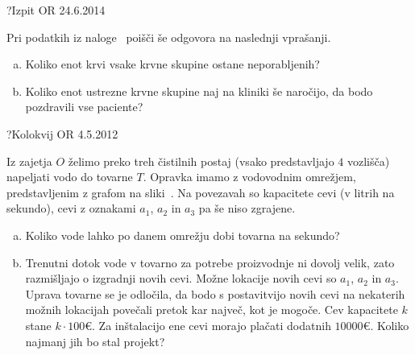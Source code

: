 \begin{naloga}{?}{Izpit OR 24.6.2014}
\begin{vprasanje}[kri2]
Pri podatkih iz naloge~ poišči še odgovora na naslednji vprašanji.
\begin{enumerate}[(a)]
\item Koliko enot krvi vsake krvne skupine ostane neporabljenih?
\item Koliko enot ustrezne krvne skupine naj na kliniki še naročijo,
da bodo po\-zdra\-vi\-li vse paciente?
\end{enumerate}
\end{vprasanje}
\begin{odgovor}
\end{odgovor}
\end{naloga}


\begin{naloga}{?}{Kolokvij OR 4.5.2012}
\begin{vprasanje}[zajetje]
Iz zajetja $O$ želimo preko treh čistilnih postaj
(vsako predstavljajo $4$ vozlišča)
napeljati vodo do tovarne $T$.
Opravka imamo z vodovodnim omrežjem,
pred\-stav\-lje\-nim z grafom na sliki~\fig{}.
Na povezavah so kapacitete cevi (v litrih na sekundo),
cevi z oznakami $a_1$, $a_2$ in $a_3$ pa še niso zgrajene.

\begin{enumerate}[(a)]
\item Koliko vode lahko po danem omrežju dobi tovarna na sekundo?

\item Trenutni dotok vode v tovarno za potrebe proizvodnje ni dovolj velik,
zato razmišljajo o izgradnji novih cevi.
Možne lokacije novih cevi so $a_1$, $a_2$ in $a_3$.
Uprava tovarne se je odločila,
da bodo s postavitvijo novih cevi na nekaterih možnih lokacijah
povečali pretok kar največ, kot je mogoče.
Cev kapacitete $k$ stane $k \cdot 100 €$.
Za inštalacijo ene cevi morajo plačati dodatnih $10000 €$.
Koliko najmanj jih bo stal projekt?
\end{enumerate}

\begin{slika}
\makebox[\textwidth][c]{
\pgfslika
}
\end{slika}
\end{vprasanje}
\begin{odgovor}
\end{odgovor}
\end{naloga}


